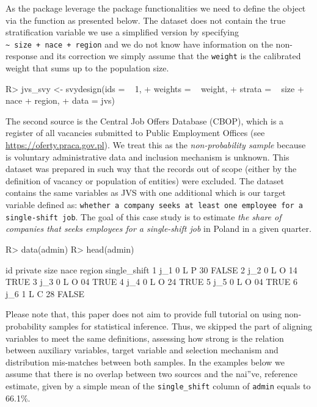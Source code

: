 \documentclass[
]{jss}
\begin{document}
As the package leverage the  package functionalities we need
to define the  object via the  function
as presented below. The dataset does not contain the true stratification
variable we use a simplified version by specifying
\texttt{\textasciitilde{}\ size\ +\ nace\ +\ region} and we do not know
have information on the non-response and its correction we simply assume
that the \texttt{weight} is the calibrated weight that sums up to the
population size.

\begin{CodeChunk}
\begin{CodeInput}
R> jvs_svy <- svydesign(ids = ~ 1, 
+                      weights = ~ weight,
+                      strata = ~ size + nace + region,
+                      data = jvs)
\end{CodeInput}
\end{CodeChunk}

The second source is the Central Job Offers Database (CBOP), which is a
register of all vacancies submitted to Public Employment Offices (see
\url{https://oferty.praca.gov.pl}). We treat this as the
\textit{non-probability sample} because is voluntary administrative data
and inclusion mechanism is unknown. This dataset was prepared in such
way that the records out of scope (either by the definition of vacancy
or population of entities) were excluded. The dataset contains the same
variables as JVS with one additional  which is our
target variable defined as:
\texttt{whether a company seeks at least one employee for a single-shift job}.
The goal of this case study is to estimate
\textit{the share of companies that seeks employees for a single-shift job}
in Poland in a given quarter.

\begin{CodeChunk}
\begin{CodeInput}
R> data(admin)
R> head(admin)
\end{CodeInput}
\begin{CodeOutput}
   id private size nace region single_shift
1 j_1       0    L    P     30        FALSE
2 j_2       0    L    O     14         TRUE
3 j_3       0    L    O     04         TRUE
4 j_4       0    L    O     24         TRUE
5 j_5       0    L    O     04         TRUE
6 j_6       1    L    C     28        FALSE
\end{CodeOutput}
\end{CodeChunk}

Please note that, this paper does not aim to provide full tutorial on
using non-probability samples for statistical inference. Thus, we
skipped the part of aligning variables to meet the same definitions,
assessing how strong is the relation between auxiliary variables, target
variable and selection mechanism and distribution mis-matches between
both samples. In the examples below we assume that there is no overlap
between two sources and the nai''ve, reference estimate, given by a
simple mean of the \texttt{single\_shift} column of \texttt{admin}
equals to 66.1\%.
\end{document}
